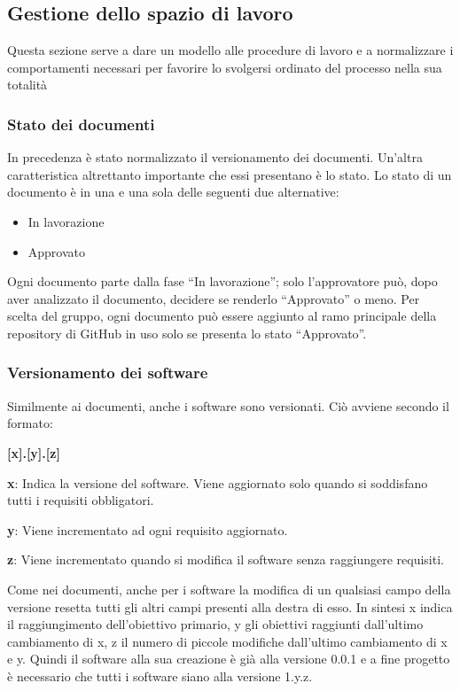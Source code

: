 \subsection{Gestione dello spazio di lavoro}
Questa sezione serve a dare un modello alle procedure di lavoro e a normalizzare i comportamenti
necessari per favorire lo svolgersi ordinato del processo nella sua totalità
\subsubsection{Stato dei documenti}
In precedenza è stato normalizzato il versionamento dei documenti.
Un'altra caratteristica altrettanto importante che essi presentano è lo stato.
Lo stato di un documento è in una e una sola delle seguenti due alternative:
\begin{itemize}
    \item In lavorazione
    \item Approvato
\end{itemize}
Ogni documento parte dalla fase ``In lavorazione''; solo l'approvatore può, dopo aver analizzato il 
documento, decidere se renderlo ``Approvato'' o meno. \newline
Per scelta del gruppo, ogni documento può essere aggiunto al ramo principale della repository di GitHub 
in uso solo se presenta lo stato ``Approvato''.
\subsubsection{Versionamento dei software}
Similmente ai documenti, anche i software sono versionati. Ciò avviene secondo il formato:
\begin{center}
    \textbf{[x].[y].[z]}
\end{center}
\begin{description}
    \item \textbf{x}: Indica la versione del software.
            Viene aggiornato solo quando si soddisfano tutti i requisiti obbligatori. 
    \item \textbf{y}: Viene incrementato ad ogni requisito aggiornato.
    \item \textbf{z}: Viene incrementato quando si modifica il software senza raggiungere requisiti.
\end{description}
Come nei documenti, anche per i software la modifica di un qualsiasi campo della versione resetta tutti gli 
altri campi presenti alla destra di esso. \newline
In sintesi x indica il raggiungimento dell'obiettivo primario, y gli obiettivi raggiunti dall'ultimo cambiamento di x,
z il numero di piccole modifiche dall'ultimo cambiamento di x e y. \newline
Quindi il software alla sua creazione è già alla versione 0.0.1 e a fine progetto è necessario che 
tutti i software siano alla versione 1.y.z.
